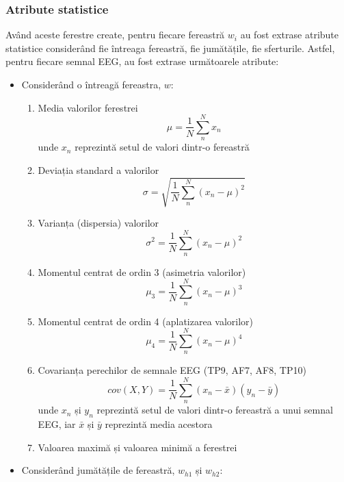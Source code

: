 \subsubsection*{Atribute statistice}
Având aceste ferestre create, pentru fiecare fereastră $w_i$ au fost extrase atribute statistice considerând fie întreaga fereastră, fie jumătățile, fie sferturile. Astfel, pentru fiecare semnal EEG, au fost extrase următoarele atribute:
\begin{itemize}
	\item Considerând o întreagă fereastra, $w$:
	\begin{enumerate}
	\item Media valorilor ferestrei
	\begin{equation}
	\mu = \frac{1}{N}\sum_n^N x_n
	\end{equation}
	unde $x_n$ reprezintă setul de valori dintr-o fereastră
	\item Deviația standard a valorilor
	\begin{equation}
	\sigma = \sqrt{\frac{1}{N}\sum_n^N(x_n - \mu)^2}
	\end{equation}
	\item Varianța (dispersia) valorilor
	\begin{equation}
	\sigma^2 = \frac{1}{N}\sum_n^N(x_n - \mu)^2
	\end{equation}
	\item Momentul centrat de ordin 3 (asimetria valorilor) 
	\begin{equation}
	\mu_3 = \frac{1}{N}\sum_n^N(x_n - \mu)^3
	\end{equation}
	\item Momentul centrat de ordin 4 (aplatizarea valorilor)
	\begin{equation}
	\mu_4 = \frac{1}{N}\sum_n^N(x_n - \mu)^4
	\end{equation}
	\item Covarianța perechilor de semnale EEG (TP9, AF7, AF8, TP10)
	\begin{equation}
	cov(X,Y) = \frac{1}{N}\sum_n^N(x_n - \bar{x})(y_n - \bar{y})
	\end{equation}
	unde $x_n$ și $y_n$ reprezintă setul de valori dintr-o fereastră a unui semnal EEG, iar $\bar{x}$ și $\bar{y}$ reprezintă media acestora
	\item Valoarea maximă și valoarea minimă a ferestrei
	\end{enumerate}
	\item Considerând jumătățile de fereastră, $w_{h1}$ și $w_{h2}$:
	\begin{enumerate}

\end{enumerate}
\end{itemize}
